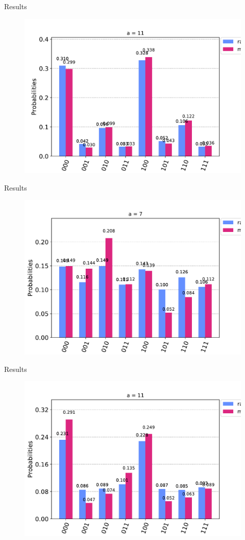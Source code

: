 \documentclass{beamer}
\begin{document}
\begin{frame}{Results}
	\begin{figure}[h]
		\centering
		\includegraphics[width=0.8\linewidth]{./figs/error_mitigation_11_cambridge.pdf}
	\end{figure}
\end{frame}

\begin{frame}{Results}
	\begin{figure}[h]
		\centering
		\includegraphics[width=0.8\linewidth]{./figs/error_mitigation_7_rochester.pdf}
	\end{figure}
\end{frame}

\begin{frame}{Results}
	\begin{figure}[h]
		\centering
		\includegraphics[width=0.8\linewidth]{./figs/error_mitigation_11_rochester.pdf}
	\end{figure}
\end{frame}
\end{document}
